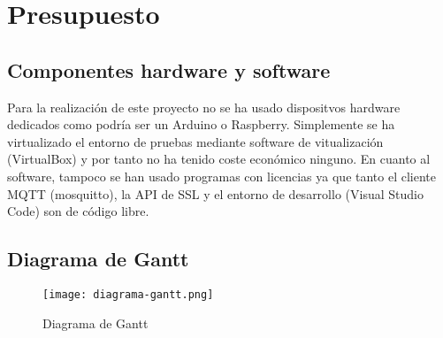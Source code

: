 \cleardoublepage

\chapter{Presupuesto}

\section{Componentes hardware y software}

Para la realización de este proyecto no se ha usado dispositvos hardware dedicados como podría ser un Arduino o Raspberry.
Simplemente se ha virtualizado el entorno de pruebas mediante software de vitualización (VirtualBox) y por tanto no ha tenido
coste económico ninguno. En cuanto al software, tampoco se han usado programas con licencias ya que tanto el cliente MQTT 
(mosquitto), la API de SSL y el entorno de desarrollo (Visual Studio Code) son de código libre.

\section{Diagrama de Gantt}

\begin{figure}[H]
    \centering
    \texttt{[image: diagrama-gantt.png]}
    \caption{Diagrama de Gantt}
\end{figure}
